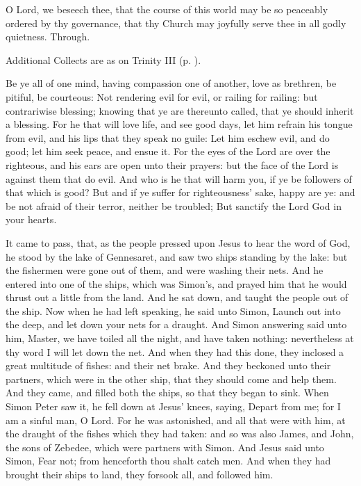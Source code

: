 \collect
{} O Lord, we beseech thee, that the course of this world may be so peaceably ordered by thy governance, that thy Church may joyfully serve thee in all godly quietness. Through.
\begin{rubric}
    Additional Collects are as on Trinity III (p. \pageref{TrinityIII}).
\end{rubric}
 Be ye all of one mind, having compassion one of another, love as brethren, be pitiful, be courteous: Not rendering evil for evil, or railing for railing: but contrariwise blessing; knowing that ye are thereunto called, that ye should inherit a blessing. For he that will love life, and see good days, let him refrain his tongue from evil, and his lips that they speak no guile: Let him eschew evil, and do good; let him seek peace, and ensue it. For the eyes of the Lord are over the righteous, and his ears are open unto their prayers: but the face of the Lord is against them that do evil. And who is he that will harm you, if ye be followers of that which is good? But and if ye suffer for righteousness' sake, happy are ye: and be not afraid of their terror, neither be troubled; But sanctify the Lord God in your hearts.


 It came to pass, that, as the people pressed upon Jesus to hear the word of God, he stood by the lake of Gennesaret, and saw two ships standing by the lake: but the fishermen were gone out of them, and were washing their nets. And he entered into one of the ships, which was Simon's, and prayed him that he would thrust out a little from the land. And he sat down, and taught the people out of the ship. Now when he had left speaking, he said unto Simon, Launch out into the deep, and let down your nets for a draught. And Simon answering said unto him, Master, we have toiled all the night, and have taken nothing: nevertheless at thy word I will let down the net. And when they had this done, they inclosed a great multitude of fishes: and their net brake. And they beckoned unto their partners, which were in the other ship, that they should come and help them. And they came, and filled both the ships, so that they began to sink. When Simon Peter saw it, he fell down at Jesus' knees, saying, Depart from me; for I am a sinful man, O Lord. For he was astonished, and all that were with him, at the draught of the fishes which they had taken: and so was also James, and John, the sons of Zebedee, which were partners with Simon. And Jesus said unto Simon, Fear not; from henceforth thou shalt catch men. And when they had brought their ships to land, they forsook all, and followed him.

